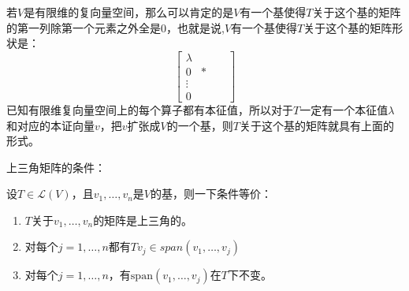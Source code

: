 \documentclass[10pt,a4paper,UTF8]{article}
\begin{document}
若\(V\)是有限维的复向量空间，那么可以肯定的是\(V\)有一个基使得\(T\)关于这个基的矩阵的第一列除第一个元素之外全是\(0\)，也就是说,\(V\)有一个基使得\(T\)关于这个基的矩阵形状是：
\begin{equation}
\label{eq:8}
\begin{bmatrix}
\lambda & & & \\
0       & * & & \\
\vdots  &  & & \\
0       &  & &
\end{bmatrix}
\end{equation}
已知有限维复向量空间上的每个算子都有本征值，所以对于\(T\)一定有一个本征值\(\lambda\)和对应的本证向量\(v\)，把\(v\)扩张成\(V\)的一个基，则\(T\)关于这个基的矩阵就具有上面的形式。

上三角矩阵的条件：
\begin{theorem}
设\(T\in \mathcal{L}(V)\)，且\(v_{1},\ldots ,v_{n}\)是\(V\)的基，则一下条件等价：
\begin{enumerate}
\item \(T\)关于\(v_{1},\ldots ,v_{n}\)的矩阵是上三角的。
\item 对每个\(j=1,\ldots ,n\)都有\(Tv_{j}\in span(v_{1},\ldots ,v_{j})\)
\item 对每个\(j=1,\ldots ,n\)，有\(\mathrm{span}(v_{1},\ldots ,v_{j})\)在\(T\)下不变。
\end{enumerate}
\end{theorem}
\end{document}
